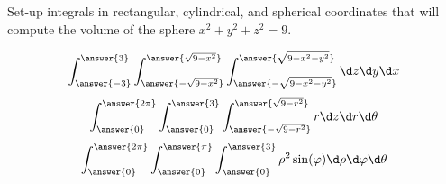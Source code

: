 \documentclass{ximera}
\author{Bart Snapp}
\begin{document}
\begin{exercise}
  Set-up integrals in rectangular, cylindrical, and spherical coordinates that
  will compute the volume of the sphere $x^2+y^2+z^2=9$.
  \begin{prompt}
  \[
  \int_{\answer{-3}}^{\answer{3}}\int_{\answer{-\sqrt{9-x^2}}}^{\answer{\sqrt{9-x^2}}}\int_{\answer{-\sqrt{9-x^2-y^2}}}^{\answer{\sqrt{9-x^2-y^2}}}\d z \d y \d x
  \]
  \[
  \int_{\answer{0}}^{\answer{2\pi}}\int_{\answer{0}}^{\answer{3}}\int_{\answer{-\sqrt{9-r^2}}}^{\answer{\sqrt{9-r^2}}}   r\d z \d r \d \theta
  \]
  \[
  \int_{\answer{0}}^{\answer{2\pi}}\int_{\answer{0}}^{\answer{\pi}}\int_{\answer{0}}^{\answer{3}}   \rho^2\sin(\varphi)\d \rho \d \varphi \d \theta
  \]
  \end{prompt}
\end{exercise}
\end{document}
